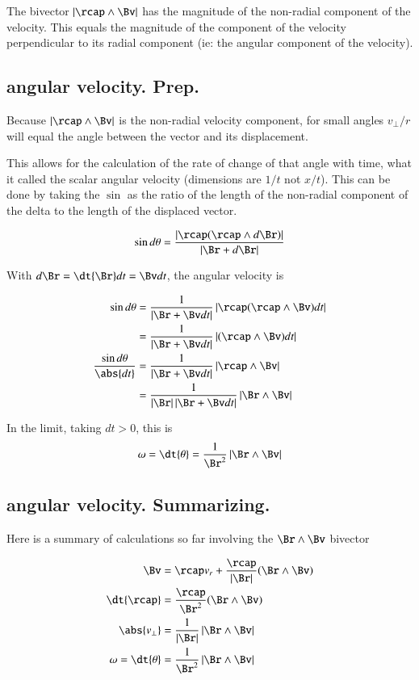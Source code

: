 The bivector $\Abs{\rcap \wedge \Bv}$ has the magnitude of the non-radial component of the velocity.  This
equals the magnitude of the component of the velocity perpendicular to its radial component (ie: the angular component of the velocity).

\subsection{angular velocity.  Prep.}

Because $\Abs{\rcap \wedge \Bv}$ is the non-radial velocity component, for small angles
${v_\perp}/r$ will equal the angle between the vector and its displacement.

This allows for the calculation of the rate of change of that angle with time, what it called the scalar
angular velocity (dimensions are $1/t$ not $x/t$).  This can be done by taking the $\sin$ as the ratio of the
length of the non-radial component of the delta to the length of the displaced vector.

\begin{align*}
\sin d\theta &= \frac{\Abs{\rcap(\rcap \wedge d\Br)}}{\Abs{\Br + d\Br}} \\
\end{align*}

With $d\Br = \dt{\Br} dt = \Bv dt$, the angular velocity is

\begin{align*}
\sin d\theta
   &= \frac{1}{\Abs{\Br + \Bv dt}} \Abs{ \rcap (\rcap \wedge \Bv) dt } \\
   &= \frac{1}{\Abs{\Br + \Bv dt}} \Abs{ (\rcap \wedge \Bv) dt } \\
\frac{\sin d\theta}{\abs{dt}}
   &= \frac{1}{\Abs{\Br + \Bv dt}} \Abs{ \rcap \wedge \Bv } \\
   &= \frac{1}{\Abs{\Br}\Abs{\Br + \Bv dt}} \Abs{ \Br \wedge \Bv } \\
\end{align*}

In the limit, taking $dt > 0$, this is
\[
\omega = \dt{\theta} = \frac{1}{\Br^2} \Abs{ \Br \wedge \Bv }
\]

\subsection{angular velocity.  Summarizing.}

Here is a summary of calculations so far involving the $\Br \wedge \Bv$ bivector

\begin{align*}
\Bv &= \rcap v_r + \frac{\rcap}{\Abs{\Br}} (\Br \wedge \Bv) \\
\dt{\rcap} &= \frac{\rcap}{\Br^2} (\Br \wedge \Bv) \\
\abs{v_{\perp}} &= \frac{1}{\Abs{\Br}} \Abs{ \Br \wedge \Bv } \\
\omega = \dt{\theta} &= \frac{1}{\Br^2} \Abs{ \Br \wedge \Bv } \\
\end{align*}

